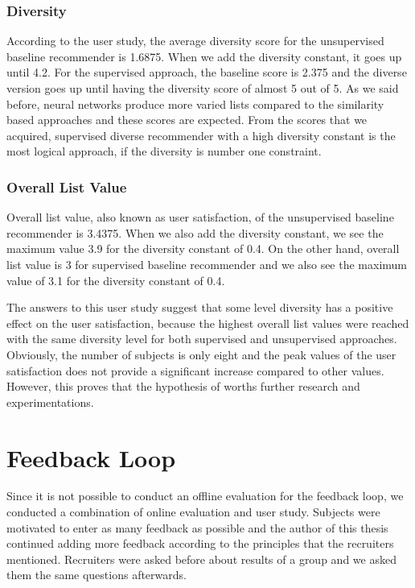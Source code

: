 \subsubsection{Diversity}

According to the user study, the average diversity score for the unsupervised baseline recommender is 1.6875. When we add the diversity constant, it goes up until 4.2. For the supervised approach, the baseline score is 2.375 and the diverse version goes up until having the diversity score of almost 5 out of 5. As we said before, neural networks produce more varied lists compared to the similarity based approaches and these scores are expected. From the scores that we acquired, supervised diverse recommender with a high diversity constant is the most logical approach, if the diversity is number one constraint. 

\subsubsection{Overall List Value}

Overall list value, also known as user satisfaction, of the unsupervised baseline recommender is 3.4375. When we also add the diversity constant, we see the maximum value 3.9 for the diversity constant of 0.4. On the other hand, overall list value is 3 for supervised baseline recommender and we also see the maximum value of 3.1 for the diversity constant of 0.4.

The answers to this user study suggest that some level diversity has a positive effect on the user satisfaction, because the highest overall list values were reached with the same diversity level for both supervised and unsupervised approaches. Obviously, the number of subjects is only eight and the peak values of the user satisfaction does not provide a significant increase compared to other values. However, this proves that the hypothesis of worths further research and experimentations.

\section{Feedback Loop}

Since it is not possible to conduct an offline evaluation for the feedback loop, we conducted a combination of online evaluation and user study. Subjects were motivated to enter as many feedback as possible and the author of this thesis continued adding more feedback according to the principles that the recruiters mentioned. Recruiters were asked before about results of a group and we asked them the same questions afterwards. 

